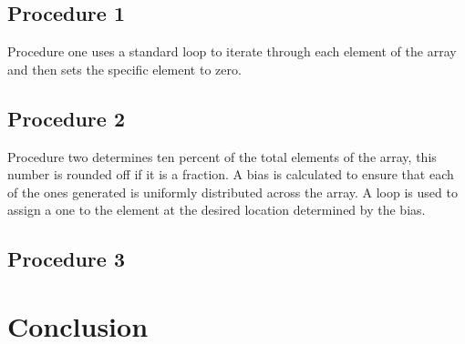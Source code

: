 \documentclass{TechReport}
\begin{document}
\subsection{Procedure 1}
Procedure one uses a standard loop to iterate through each element of the array and then sets the specific element to zero.

\subsection{Procedure 2}
Procedure two determines ten percent of the total elements of the array, this number is rounded off if it is a fraction. A bias is calculated to ensure that each of the ones generated is uniformly distributed across the array. A loop is used to assign a one to the element at the desired location determined by the bias.

\subsection{Procedure 3}


\section{Conclusion}
\label{sec:Conclusion}


\begin{thebibliography}{99}	



	 
\end{thebibliography}
\end{document}
